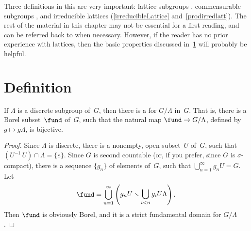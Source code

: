 Three definitions in this  are very important: lattice subgroups
, commensurable subgroups
, and irreducible lattices
(\ref{irreducibleLattice} and~\ref{prodirredlatt}). The
rest of the material in this chapter may not be essential
for a first reading, and can be referred back to when
necessary. However, if the reader has no prior experience
with lattices, then the basic properties discussed
in~\cref{LattDefnSect} will probably be helpful.



\section{Definition} \label{LattDefnSect}

\begin{lem} \label{ExistsFundDom}
  If $\Lambda$ is a discrete subgroup of~$G$, then 
there is a {\normalfont{}} for $G/\Lambda$ in~$G$.
That is, there is a Borel subset~$\fund$ of~$G$, such that
the natural map $\fund \to G/\Lambda$, defined
by $g \mapsto g \Lambda$, is bijective.
 \end{lem}

\begin{proof}
 Since $\Lambda$ is discrete, there is a nonempty, open
subset~$U$ of~$G$, such that $(U^{-1} \, U) \cap \Lambda =
\{e\}$. Since $G$ is second countable (or, if you prefer,
since $G$ is $\sigma$-compact), there is a sequence
$\{g_n\}$ of elements of~$G$, such that $\bigcup_{n=1}^\infty g_n
U = G$. Let
 $$ \fund = \bigcup_{n = 1}^\infty \left( 
 \raise1pt\hbox{$\displaystyle %
 g_n U 
\smallsetminus \bigcup_{i< n} g_{i} U \Lambda
$}
  \right) .$$
 Then $\fund$ is obviously Borel, and it is a strict fundamental domain for $G/\Lambda$ 
 .
 \end{proof}

